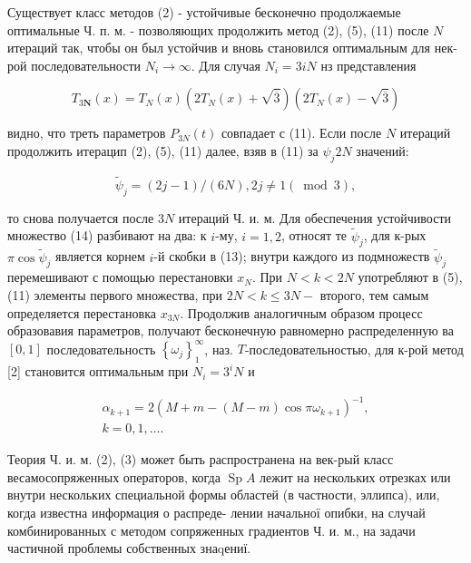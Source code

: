 \documentclass[10pt]{article}
\begin{document}
Существует класс методов (2) - устойчивые бесконечно продолжаемые оптимальные Ч. п. м. - позволяющих продолжить метод (2), (5), (11) после $N$ итераций так, чтобы он был устойчив и вновь становился оптимальным для нек-рой последовательности $N_{i} \rightarrow \infty$. Для случая $N_{i}=3 i N$ нз представления



\[

T_{3 \boldsymbol{N}}(x)=T_{N}(x)\left(2 T_{N}(x)+\sqrt{\overline{3}}\right)\left(2 T_{N}(x)-\sqrt{\overline{3}}\right)

\]



видно, что треть параметров $P_{3 N}(t)$ совпадает с (11). Если после $N$ итераций продолжить итерацип (2), (5), (11) далее, взяв в (11) за $\psi_{j} 2 N$ значений:



\[

\tilde{\psi}_{j}=(2 j-1) /(6 N), 2 j \neq 1(\bmod 3),

\]



то снова получается после $3 N$ итераций Ч. и. м. Для обеспечения устойчивости множество (14) разбивают на два: к $i$-му, $i=1,2$, относят те $\tilde{\psi}_{j}$, для к-рых $\pi \cos \tilde{\psi}_{j}$ является корнем $i$-й скобки в (13); внутри каждого из подмножеств $\tilde{\psi}_{j}$ перемешивают с помощью перестановки $x_{N}$. При $N<k<2 N$ употребляют в (5), (11) элементы первого множества, при $2 N<k \leqslant 3 N-$ второго, тем самым определяется перестановка $x_{3 N}$. Продолжив аналогичным образом процесс образовавия параметров, получают бесконечную равномерно распределенную ва $[0,1]$ последовательность $\left\{\omega_{j}\right\}_{1}^{\infty}$, наз. $T$-последовательностью, для к-рой метод [2] становится оптимальным при $N_{i}=3^{i} N$ и



\[

\begin{gathered}

\alpha_{k+1}=2\left(M+m-(M-m) \cos \pi \omega_{k+1}\right)^{-1}, \\

k=0,1, \ldots .

\end{gathered}

\]



Теория Ч. и. м. (2), (3) может быть распространена на век-рый класс весамосопряженных операторов, когда $\operatorname{Sp} A$ лежит на нескольких отрезках или внутри нескольких специальной формы областей (в частности, эллипса), или, когда известна информация о распреде- лении начальної опибки, на случай комбинированных с методом сопряженных градиентов Ч. и. м., на задачи частичной проблемы собственных знаqениї.
\end{document}
